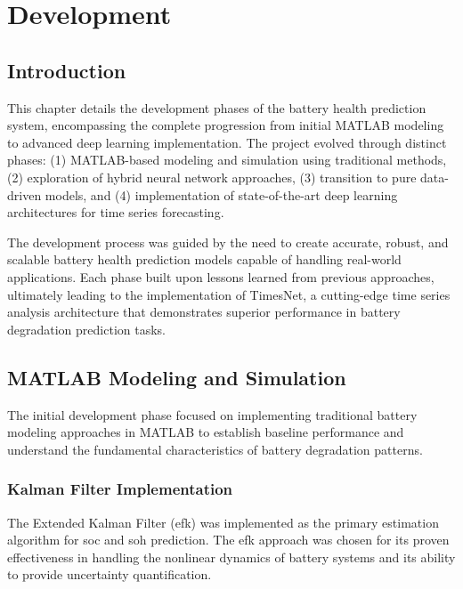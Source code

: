 \chapter{Development}
\label{ch:Development}

\section{Introduction}

This chapter details the development phases of the battery health prediction system, encompassing the complete progression from initial MATLAB modeling to advanced deep learning implementation. The project evolved through distinct phases: (1) MATLAB-based modeling and simulation using traditional methods, (2) exploration of hybrid neural network approaches, (3) transition to pure data-driven models, and (4) implementation of state-of-the-art deep learning architectures for time series forecasting.

The development process was guided by the need to create accurate, robust, and scalable battery health prediction models capable of handling real-world applications. Each phase built upon lessons learned from previous approaches, ultimately leading to the implementation of TimesNet, a cutting-edge time series analysis architecture that demonstrates superior performance in battery degradation prediction tasks.

\section{MATLAB Modeling and Simulation}

The initial development phase focused on implementing traditional battery modeling approaches in MATLAB to establish baseline performance and understand the fundamental characteristics of battery degradation patterns.

\subsection{Kalman Filter Implementation}

The Extended Kalman Filter (\gls{efk}) was implemented as the primary estimation algorithm for \gls{soc} and \gls{soh} prediction. The \gls{efk} approach was chosen for its proven effectiveness in handling the nonlinear dynamics of battery systems and its ability to provide uncertainty quantification.

